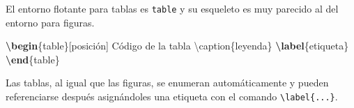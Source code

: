 \documentclass[
  spanish,
  a4paper,
]{scrreport}
\newenvironment{Shaded}{\begin{snugshade}}{\end{snugshade}}
\newcommand{\ExtensionTok}[1]{\textcolor[rgb]{0.00,0.23,0.31}{#1}}
\newcommand{\FunctionTok}[1]{\textcolor[rgb]{0.28,0.35,0.67}{#1}}
\newcommand{\KeywordTok}[1]{\textcolor[rgb]{0.00,0.23,0.31}{\textbf{#1}}}
\newcommand{\NormalTok}[1]{\textcolor[rgb]{0.00,0.23,0.31}{#1}}
\theoremstyle{definition}
\theoremstyle{remark}
\begin{document}
El entorno flotante para tablas es \texttt{table} y su esqueleto es muy
parecido al del entorno para figuras.

\begin{Shaded}
\begin{Highlighting}[]
\KeywordTok{\textbackslash{}begin}\NormalTok{\{}\ExtensionTok{table}\NormalTok{\}[posición]}
\NormalTok{    Código de la tabla}
\FunctionTok{\textbackslash{}caption}\NormalTok{\{leyenda\}}
\KeywordTok{\textbackslash{}label}\NormalTok{\{}\ExtensionTok{etiqueta}\NormalTok{\}}
\KeywordTok{\textbackslash{}end}\NormalTok{\{}\ExtensionTok{table}\NormalTok{\}}
\end{Highlighting}
\end{Shaded}

Las tablas, al igual que las figuras, se enumeran automáticamente y
pueden referenciarse después asignándoles una etiqueta con el comando
\texttt{\textbackslash{}label\{...\}}.
\end{document}
